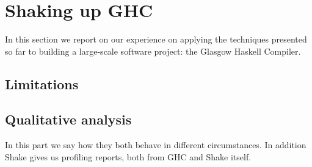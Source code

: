 \section{Shaking up GHC\label{sec:ghc}}

In this section we report on our experience on applying the techniques presented
so far to building a large-scale software project: the Glasgow Haskell Compiler.

\subsection{Limitations\label{sec:limitations}}

\subsection{Qualitative analysis}

In this part we say how they both behave in different circumstances. In addition Shake gives us profiling reports, both from GHC and Shake itself.

